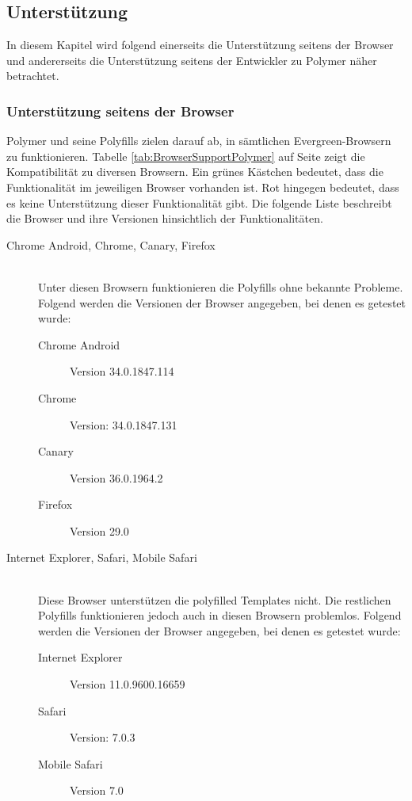 \subsection{Unterstützung}
\label{sec:4_Polymer_Support}

In diesem Kapitel wird folgend einerseits die Unterstützung seitens der Browser und andererseits die Unterstützung seitens der Entwickler zu Polymer näher betrachtet.

\subsubsection{Unterstützung seitens der Browser}

Polymer und seine Polyfills zielen darauf ab, in sämtlichen \glqq Evergreen\grqq -Browsern zu funktionieren. Tabelle \ref{tab:BrowserSupportPolymer} auf Seite \pageref{tab:BrowserSupportPolymer} zeigt die Kompatibilität zu diversen Browsern. Ein grünes Kästchen bedeutet, dass die Funktionalität im jeweiligen Browser vorhanden ist. Rot hingegen bedeutet, dass es keine Unterstützung dieser Funktionalität gibt. Die folgende Liste beschreibt die Browser und ihre Versionen hinsichtlich der Funktionalitäten.

\begin{description}
\item [Chrome Android, Chrome, Canary, Firefox] \hfill \\
Unter diesen Browsern funktionieren die Polyfills ohne bekannte Probleme. Folgend werden die Versionen der Browser angegeben, bei denen es getestet wurde:
\begin{description}
\item[Chrome Android] Version 34.0.1847.114
\item[Chrome] Version: 34.0.1847.131
\item[Canary] Version 36.0.1964.2
\item[Firefox] Version 29.0
\end{description}
\item[Internet Explorer, Safari, Mobile Safari] \hfill \\
Diese Browser unterstützen die polyfilled Templates nicht. Die restlichen Polyfills funktionieren jedoch auch in diesen Browsern problemlos. Folgend werden die Versionen der Browser angegeben, bei denen es getestet wurde:
\begin{description}
\item[Internet Explorer] Version 11.0.9600.16659
\item[Safari] Version: 7.0.3
\item[Mobile Safari] Version 7.0
\end{description}
\end{description}


